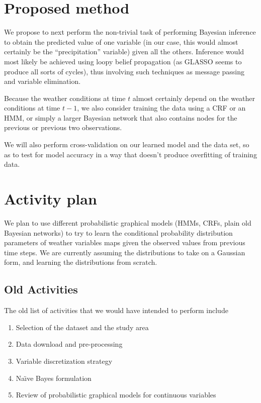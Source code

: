 \documentclass{article}
\begin{document}
\section{Proposed method}

We propose to next perform the non-trivial task of performing Bayesian inference to obtain the predicted value of one variable (in our case, this would almost certainly be the ``precipitation'' variable) given all the others. Inference would most likely be achieved using loopy belief propagation (as GLASSO seems to produce all sorts of cycles), thus involving such techniques as message passing and variable elimination.

Because the weather conditions at time $t$ almost certainly depend on the weather conditions at time $t - 1$, we also consider training the data using a CRF or an HMM, or simply a larger Bayesian network that also contains nodes for the previous or previous two observations.

We will also perform cross-validation on our learned model and the data set, so as to test for model accuracy in a way that doesn't produce overfitting of training data.

\section{Activity plan}

We plan to use different probabilistic graphical models (HMMs, CRFs, plain old Bayesian networks) to try to learn the
conditional probability distribution parameters of weather variables maps given the observed values
from previous time steps. We are currently assuming the distributions to take on a Gaussian form, and learning the distributions from scratch.

\subsection{Old Activities}
The old list of activities that we would have intended to perform include
\begin{enumerate}
\item Selection of the dataset and the study area
\item Data download and pre-processing
\item Variable discretization strategy
\item Na\"\i ve Bayes formulation
\item Review of probabilistic graphical models for continuous variables
\end{enumerate}
\end{document}
